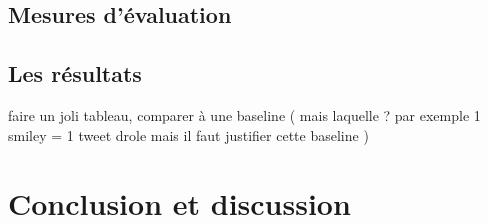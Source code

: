 \documentclass[10pt,a4paper,twoside]{article}
\begin{document}
\subsection{Mesures d'évaluation}

\subsection{Les résultats}
faire un joli tableau, comparer à une baseline ( mais laquelle ? par exemple  1 smiley = 1 tweet drole mais il faut justifier cette baseline ) 

\section{Conclusion et discussion}

%
%
%
%
%
%
%
\end{document}
